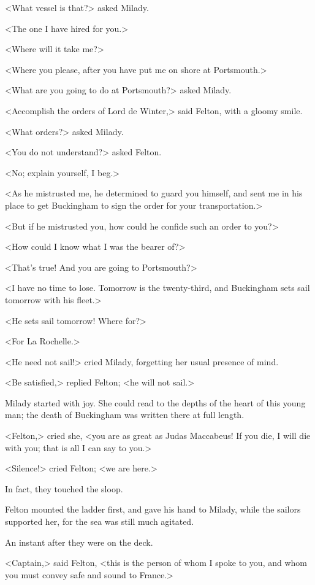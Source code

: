<What vessel is that?> asked Milady. 

<The one I have hired for you.> 

<Where will it take me?> 

<Where you please, after you have put me on shore at Portsmouth.> 

<What are you going to do at Portsmouth?> asked Milady. 

<Accomplish the orders of Lord de Winter,> said Felton, with a gloomy smile. 

<What orders?> asked Milady. 

<You do not understand?> asked Felton. 

<No; explain yourself, I beg.> 

<As he mistrusted me, he determined to guard you himself, and sent me in his place to get Buckingham to sign the order for your transportation.> 

<But if he mistrusted you, how could he confide such an order to you?> 

<How could I know what I was the bearer of?> 

<That's true! And you are going to Portsmouth?> 

<I have no time to lose. Tomorrow is the twenty-third, and Buckingham sets sail tomorrow with his fleet.> 

<He sets sail tomorrow! Where for?> 

<For La Rochelle.> 

<He need not sail!> cried Milady, forgetting her usual presence of mind. 

<Be satisfied,> replied Felton; <he will not sail.> 

Milady started with joy. She could read to the depths of the heart of this young man; the death of Buckingham was written there at full length. 

<Felton,> cried she, <you are as great as Judas Maccabeus! If you die, I will die with you; that is all I can say to you.> 

<Silence!> cried Felton; <we are here.> 

In fact, they touched the sloop. 

Felton mounted the ladder first, and gave his hand to Milady, while the sailors supported her, for the sea was still much agitated. 

An instant after they were on the deck. 

<Captain,> said Felton, <this is the person of whom I spoke to you, and whom you must convey safe and sound to France.> 

